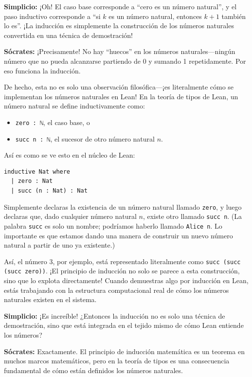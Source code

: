 \textbf{Simplicio:} ¡Oh! El caso base corresponde a ``cero es un número
natural'', y el paso inductivo corresponde a ``si $k$ es un número
natural, entonces $k+1$ también lo es''. ¡La inducción es simplemente la
construcción de los números naturales convertida en una técnica de
demostración!

\textbf{Sócrates:} ¡Precisamente! No hay ``huecos'' en los números
naturales—ningún número que no pueda alcanzarse partiendo de 0 y sumando
1 repetidamente. Por eso funciona la inducción.

De hecho, esta no es solo una observación filosófica—¡es literalmente
cómo se implementan los números naturales en Lean! En la teoría de tipos
de Lean, un número natural se define inductivamente como:

\begin{itemize}
  \item \texttt{zero : ℕ}, el caso base, o
  \item \texttt{succ n : ℕ}, el sucesor de otro número natural
        $n$.
\end{itemize}

Así es como se ve esto en el núcleo de Lean:

\begin{verbatim}
inductive Nat where
  | zero : Nat
  | succ (n : Nat) : Nat
\end{verbatim}

Simplemente declaras la existencia de un número natural llamado
\texttt{zero}, y luego declaras que, dado cualquier número natural
$n$, existe otro llamado \texttt{succ n}. (La palabra \texttt{succ} es
solo un nombre; podríamos haberlo llamado \texttt{Alice n}. Lo importante
es que estamos dando una manera de construir un nuevo número natural a
partir de uno ya existente.)

Así, el número 3, por ejemplo, está representado literalmente como
\texttt{succ (succ (succ zero))}. ¡El principio de inducción no
solo se parece a esta construcción, sino que lo explota directamente!
Cuando demuestras algo por inducción en Lean, estás trabajando con la
estructura computacional real de cómo los números naturales existen en el
sistema.

\textbf{Simplicio:} ¡Es increíble! ¿Entonces la inducción no es solo
una técnica de demostración, sino que está integrada en el tejido mismo de
cómo Lean entiende los números?

\textbf{Sócrates:} Exactamente. El principio de inducción matemática es
un teorema en muchos marcos matemáticos, pero en la teoría de tipos es una
consecuencia fundamental de cómo están definidos los números naturales.

